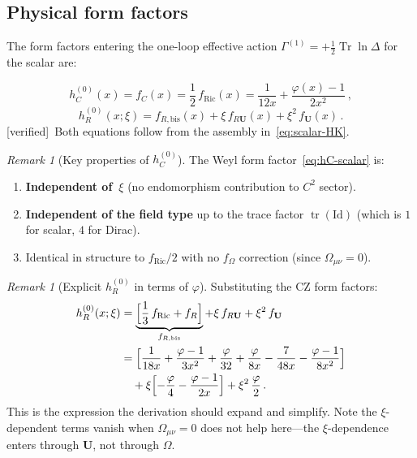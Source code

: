 \documentclass[12pt,a4paper]{article}
\theoremstyle{definition}
\theoremstyle{remark}
\newtheorem{remark}[proposition]{Remark}
\newcommand{\Tr}{\operatorname{Tr}}
\newcommand{\tr}{\operatorname{tr}}
\newcommand{\Id}{\mathrm{Id}}
\newcommand{\verified}{\textcolor{green!50!black}{\textsf{[verified]}}}
\begin{document}
\subsection{Physical form factors}

The form factors entering the one-loop effective action
$\Gamma^{(1)} = +\frac{1}{2}\Tr\ln\Delta$ for the scalar are:

\begin{equation}
  \boxed{
  h_C^{(0)}(x) = f_C(x)
  = \frac{1}{2}\,f_{\mathrm{Ric}}(x)
  = \frac{1}{12x} + \frac{\varphi(x) - 1}{2x^2}\,,
  }
  \label{eq:hC-scalar}
\end{equation}
\begin{equation}
  \boxed{
  h_R^{(0)}(x;\xi) = f_{R,\mathrm{bis}}(x)
    + \xi\,f_{R\mathbf{U}}(x) + \xi^2\,f_{\mathbf{U}}(x)\,.
  }
  \label{eq:hR-scalar}
\end{equation}
\verified\ Both equations follow from the assembly in~\eqref{eq:scalar-HK}.

\begin{remark}[Key properties of $h_C^{(0)}$]
\label{rem:hC-properties}
The Weyl form factor~\eqref{eq:hC-scalar} is:
\begin{enumerate}[nosep]
\item \textbf{Independent of~$\xi$} (no endomorphism contribution
  to $C^2$ sector).
\item \textbf{Independent of the field type} up to the trace factor
  $\tr(\Id)$ (which is $1$ for scalar, $4$ for Dirac).
\item Identical in structure to $f_{\mathrm{Ric}}/2$ with no
  $f_\Omega$ correction (since $\Omega_{\mu\nu} = 0$).
\end{enumerate}
\end{remark}

\begin{remark}[Explicit $h_R^{(0)}$ in terms of $\varphi$]
\label{rem:hR-explicit}
Substituting the CZ form factors:
\begin{align}
  h_R^{(0)}(x;\xi) &=
  \underbrace{\Bigl[\frac{1}{3}\,f_{\mathrm{Ric}} + f_R\Bigr]}_{f_{R,\mathrm{bis}}}
  + \xi\,f_{R\mathbf{U}} + \xi^2\,f_{\mathbf{U}}
  \nonumber\\
  &= \Bigl[\frac{1}{18x} + \frac{\varphi-1}{3x^2}
    + \frac{\varphi}{32} + \frac{\varphi}{8x}
    - \frac{7}{48x} - \frac{\varphi-1}{8x^2}\Bigr]
  \nonumber\\
  &\quad + \xi\Bigl[-\frac{\varphi}{4}
    - \frac{\varphi-1}{2x}\Bigr]
  + \xi^2\,\frac{\varphi}{2}\,.
  \label{eq:hR-explicit}
\end{align}
This is the expression the derivation should expand and simplify.
Note the $\xi$-dependent terms vanish when $\Omega_{\mu\nu}=0$
does not help here---the $\xi$-dependence enters through
$\mathbf{U}$, not through $\Omega$.
\end{remark}
\end{document}
